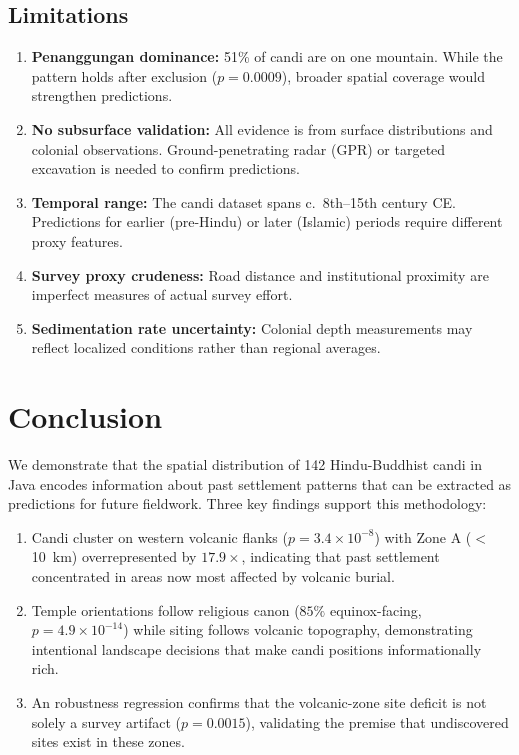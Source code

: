 \documentclass[12pt,a4paper]{article}
\begin{document}
\subsection{Limitations}

\begin{enumerate}
    \item \textbf{Penanggungan dominance:} 51\% of candi are on one mountain. While the pattern holds after exclusion ($p=0.0009$), broader spatial coverage would strengthen predictions.
    \item \textbf{No subsurface validation:} All evidence is from surface distributions and colonial observations. Ground-penetrating radar (GPR) or targeted excavation is needed to confirm predictions.
    \item \textbf{Temporal range:} The candi dataset spans c.\ 8th--15th century CE. Predictions for earlier (pre-Hindu) or later (Islamic) periods require different proxy features.
    \item \textbf{Survey proxy crudeness:} Road distance and institutional proximity are imperfect measures of actual survey effort.
    \item \textbf{Sedimentation rate uncertainty:} Colonial depth measurements may reflect localized conditions rather than regional averages.
\end{enumerate}

\section{Conclusion}

We demonstrate that the spatial distribution of 142 Hindu-Buddhist candi in Java encodes information about past settlement patterns that can be extracted as predictions for future fieldwork. Three key findings support this methodology:

\begin{enumerate}
    \item Candi cluster on western volcanic flanks ($p=3.4\times10^{-8}$) with Zone A ($<$10~km) overrepresented by $17.9\times$, indicating that past settlement concentrated in areas now most affected by volcanic burial.
    \item Temple orientations follow religious canon ($85\%$ equinox-facing, $p=4.9\times10^{-14}$) while siting follows volcanic topography, demonstrating intentional landscape decisions that make candi positions informationally rich.
    \item An robustness regression confirms that the volcanic-zone site deficit is not solely a survey artifact ($p=0.0015$), validating the premise that undiscovered sites exist in these zones.
\end{enumerate}
\end{document}
